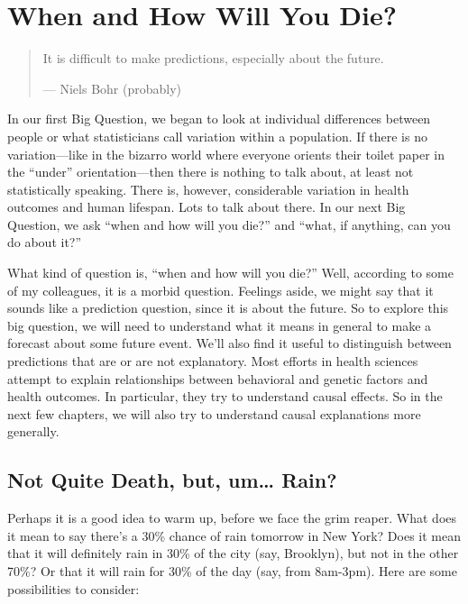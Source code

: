 \documentclass[openany]{book}
\begin{document}
\hypertarget{when-and-how-will-you-die}{%
\chapter{When and How Will You Die?}\label{when-and-how-will-you-die}}

\begin{quote}
It is difficult to make predictions, especially about the future.

--- Niels Bohr (probably)
\end{quote}

In our first Big Question, we began to look at individual differences between people or what statisticians call variation within a population. If there is no variation---like in the bizarro world where everyone orients their toilet paper in the ``under'' orientation---then there is nothing to talk about, at least not statistically speaking. There is, however, considerable variation in health outcomes and human lifespan. Lots to talk about there. In our next Big Question, we ask ``when and how will you die?'' and ``what, if anything, can you do about it?''

What kind of question is, ``when and how will you die?'' Well, according to some of my colleagues, it is a morbid question. Feelings aside, we might say that it sounds like a prediction question, since it is about the future. So to explore this big question, we will need to understand what it means in general to make a forecast about some future event. We'll also find it useful to distinguish between predictions that are or are not explanatory. Most efforts in health sciences attempt to explain relationships between behavioral and genetic factors and health outcomes. In particular, they try to understand causal effects. So in the next few chapters, we will also try to understand causal explanations more generally.

\hypertarget{not-quite-death-but-um-rain}{%
\section*{Not Quite Death, but, um\ldots{} Rain?}\label{not-quite-death-but-um-rain}}

Perhaps it is a good idea to warm up, before we face the grim reaper. What does it mean to say there's a 30\% chance of rain tomorrow in New York? Does it mean that it will definitely rain in 30\% of the city (say, Brooklyn), but not in the other 70\%? Or that it will rain for 30\% of the day (say, from 8am-3pm). Here are some possibilities to consider:
\end{document}
